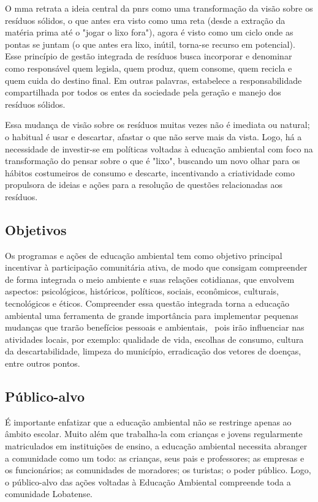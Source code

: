 O \gls{mma} retrata a ideia central da \gls{pnrs} como uma transformação da visão sobre os resíduos sólidos, o que antes era visto como uma reta (desde a extração da matéria prima até o "jogar o lixo fora"), agora é visto como um ciclo onde as pontas se juntam (o que antes era lixo, inútil, torna-se recurso em potencial). Esse princípio de gestão integrada de resíduos busca incorporar e denominar como responsável quem legisla, quem produz, quem consome, quem recicla e quem cuida do destino final. Em outras palavras, estabelece a responsabilidade compartilhada por todos os entes da sociedade pela geração e manejo dos resíduos sólidos. 

Essa mudança de visão sobre os resíduos muitas vezes não é imediata ou natural; o habitual é usar e descartar, afastar o que não serve mais da vista. Logo, há a necessidade de investir-se em políticas voltadas à educação ambiental com foco na transformação do pensar sobre o que é "lixo", buscando um novo olhar para os hábitos costumeiros de consumo e descarte, incentivando a criatividade como propulsora de ideias e ações para a resolução de questões relacionadas aos resíduos.

\subsection{Objetivos}

Os programas e ações de educação ambiental tem como objetivo principal incentivar à participação comunitária ativa, de modo que consigam compreender de forma integrada o meio ambiente e suas relações cotidianas, que envolvem aspectos: psicológicos, históricos, políticos, sociais, econômicos, culturais, tecnológicos e éticos. Compreender essa questão integrada torna a educação ambiental uma ferramenta de grande importância para implementar pequenas mudanças que trarão benefícios pessoais e ambientais,  pois irão influenciar nas atividades locais, por exemplo: qualidade de vida, escolhas de consumo, cultura da descartabilidade, limpeza do município, erradicação dos vetores de doenças, entre outros pontos. 

\subsection{Público-alvo}

É importante enfatizar que a educação ambiental não se restringe apenas ao âmbito escolar. Muito além que trabalha-la com crianças e jovens regularmente matriculados em instituições de ensino, a educação ambiental necessita abranger a comunidade como um todo: as crianças, seus pais e professores; as empresas e os funcionários; as comunidades de moradores; os turistas; o poder público. Logo, o público-alvo das ações voltadas à Educação Ambiental compreende toda a comunidade Lobatense.

